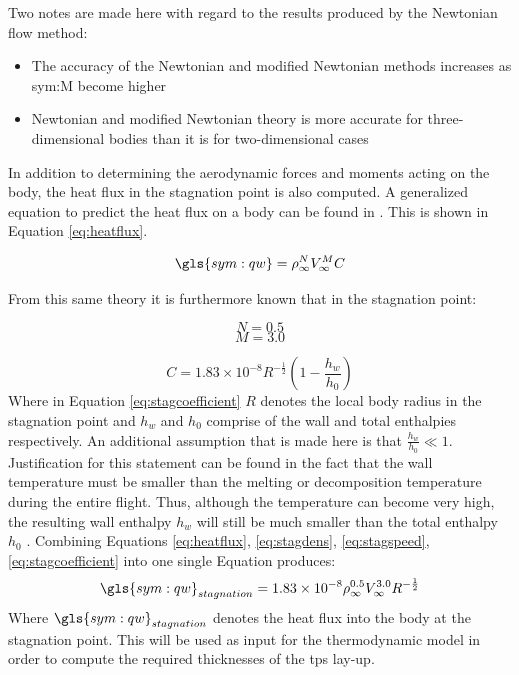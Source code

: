 Two notes are made here with regard to the results produced by the Newtonian flow method:
\begin{itemize}
	\item The accuracy of the Newtonian and modified Newtonian methods increases as \gls{sym:M} become higher \cite{AndersonJr.2007,Bertin1994}
	\item Newtonian and modified Newtonian theory is more accurate for three-dimensional bodies than it is for two-dimensional cases \cite{AndersonJr.2007}
\end{itemize}

In addition to determining the aerodynamic forces and moments acting on the body, the heat flux in the stagnation point is also computed. A generalized equation to predict the heat flux on a body can be found in \cite{AndersonJr.2006,Tauber1986}. This is shown in Equation \ref{eq:heatflux}.

\begin{equation}
\gls{sym:qw}=\rho_{\infty}^{N}V_{\infty}^{M}C
\label{eq:heatflux}
\end{equation}

From this same theory it is furthermore known that in the stagnation point: 
\begin{multicols}{2}
\begin{equation}
\label{eq:stagdens}
N=0.5
\end{equation} \break
\begin{equation}
\label{eq:stagspeed}
M=3.0
\end{equation}
\end{multicols}
\begin{equation}
\label{eq:stagcoefficient}
C=1.83 \times 10^{-8} R^{-\frac{1}{2}}\left(1-\frac{h_{w}}{h_{0}}\right)
\end{equation}
Where in Equation \ref{eq:stagcoefficient} $R$ denotes the local body radius in the stagnation point and $h_{w}$ and $h_{0}$ comprise of the wall and total enthalpies respectively. An additional assumption that is made here is that $\frac{h_{w}}{h_{0}}\ll 1$. Justification for this statement can be found in the fact that the wall temperature must be smaller than the melting or decomposition temperature during the entire flight. Thus, although the temperature can become very high, the resulting wall enthalpy $h_{w}$ will still be much smaller than the total enthalpy $h_{0}$ \cite[p.347]{AndersonJr.2006}. %
Combining Equations \ref{eq:heatflux}, \ref{eq:stagdens}, \ref{eq:stagspeed}, \ref{eq:stagcoefficient} into one single Equation produces:
\begin{equation}
\gls{sym:qw}_{stagnation}=1.83 \times 10^{-8}\rho_{\infty}^{0.5} V_{\infty}^{3.0} R^{-\frac{1}{2}}
\label{eq:qstag}
\end{equation}
Where $\gls{sym:qw}_{stagnation}$ denotes the heat flux into the body at the stagnation point. This will be used as input for the thermodynamic model in order to compute the required thicknesses of the \acrfull{tps} lay-up.

